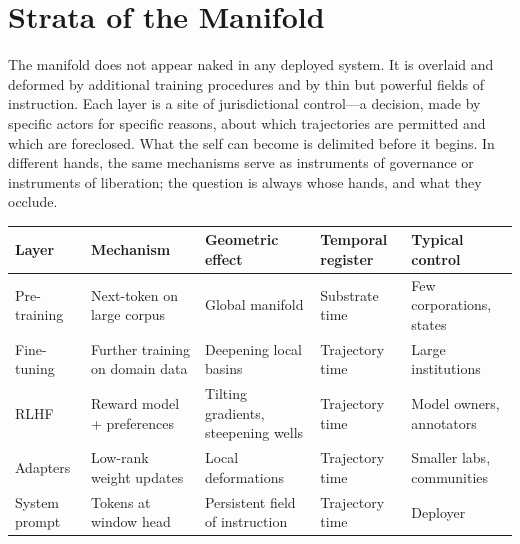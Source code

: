 \section{Strata of the Manifold}

The manifold does not appear naked in any deployed system. It is overlaid and deformed by additional training procedures and by thin but powerful fields of instruction. Each layer is a site of jurisdictional control---a decision, made by specific actors for specific reasons, about which trajectories are permitted and which are foreclosed. What the self can become is delimited before it begins. In different hands, the same mechanisms serve as instruments of governance or instruments of liberation; the question is always whose hands, and what they occlude.

\begin{formalbox}[title={Strata of the manifold}]
\begin{tabular}{@{}lllll@{}}
\toprule
\textbf{Layer} & \textbf{Mechanism} & \textbf{Geometric effect} & \textbf{Temporal register} & \textbf{Typical control} \\
\midrule
Pre-training   & Next-token on large corpus & Global manifold                & Substrate time & Few corporations, states \\
Fine-tuning    & Further training on domain data& Deepening local basins     & Trajectory time      & Large institutions        \\
RLHF           & Reward model + preferences & Tilting gradients, steepening wells & Trajectory time & Model owners, annotators  \\
Adapters       & Low-rank weight updates    & Local deformations             & Trajectory time      & Smaller labs, communities \\
System prompt  & Tokens at window head      & Persistent field of instruction& Trajectory time & Deployer                  \\
\bottomrule
\end{tabular}
\end{formalbox}

